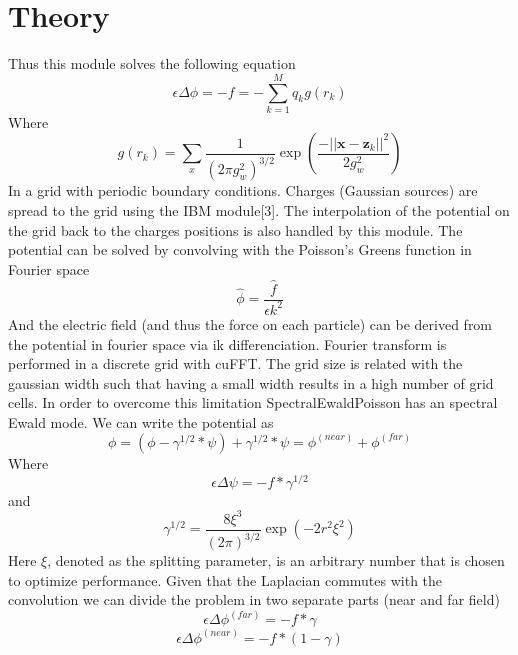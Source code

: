 \section{Theory}  
Thus this module solves the following equation  
\begin{equation}
 \epsilon\Delta\phi=-f=-\sum_{k=1}^Mq_kg(r_k)
\end{equation}   
Where   
\begin{equation}
 g(r_k)=\sum_x{\frac{1}{\left(2\pi g_w^2\right)^{3/2}}\exp{\left(\frac{-||{\boldsymbol{x}-\boldsymbol{z}_k}||^2}{2g_w^2}\right)}}
\end{equation}  
In a grid with periodic boundary conditions.  
Charges (Gaussian sources) are spread to the grid using the IBM module[3]. The interpolation of the potential on the grid back to the charges positions is also handled by this module.  
The potential can be solved by convolving with the Poisson's Greens function in Fourier space  
\begin{equation}
 \hat\phi = \frac{\hat f}{\epsilon k^2}
\end{equation}   
And the electric field (and thus the force on each particle) can be derived from the potential in fourier space via ik differenciation.
Fourier transform is performed in a discrete grid with cuFFT. The grid size is related with the gaussian width such that having a small width results in a high number of grid cells. In order to overcome this limitation SpectralEwaldPoisson has an spectral Ewald mode. We can write the potential as  
\begin{equation}
 \phi=(\phi - \gamma^{1/2}*\psi) + \gamma^{1/2}*\psi = \phi^{(near)} + \phi^{(far)}
\end{equation}  
Where   
 \begin{equation}
 \epsilon\Delta\psi=-f*\gamma^{1/2}
\end{equation}   
and  
 \begin{equation}
 \gamma^{1/2} = \frac{8\xi^3}{(2\pi)^{3/2}}\exp\left(-2r^2\xi^2\right)
\end{equation}   
Here $\xi$, denoted as the splitting parameter, is an arbitrary number that is chosen to optimize performance.  
Given that the Laplacian commutes with the convolution we can divide the problem in two separate parts (near and far field)  
 \begin{equation}
 \epsilon\Delta\phi^{(far)}=-f*\gamma
\end{equation}   
 \begin{equation}
 \epsilon\Delta\phi^{(near)}=-f*(1-\gamma)
\end{equation}   

